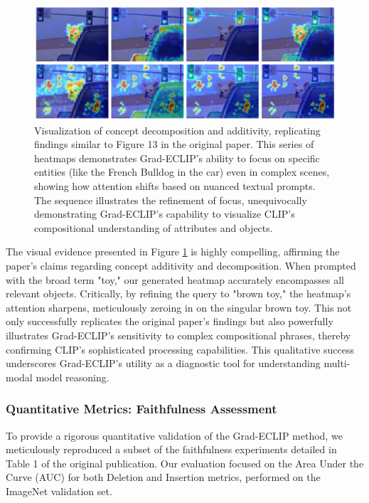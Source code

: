 \documentclass[10pt]{article} %
\begin{document}
\begin{figure}[h!]
\centering
\includegraphics[width=\linewidth]{./../assets/images/Grad-ECLIP-output.png} 
\caption{Visualization of concept decomposition and additivity, replicating findings similar to Figure 13 in the original paper. This series of heatmaps demonstrates Grad-ECLIP's ability to focus on specific entities (like the French Bulldog in the car) even in complex scenes, showing how attention shifts based on nuanced textual prompts. The sequence illustrates the refinement of focus, unequivocally demonstrating Grad-ECLIP's capability to visualize CLIP's compositional understanding of attributes and objects.}
\label{fig:decomposition_repro}
\end{figure}

The visual evidence presented in Figure \ref{fig:decomposition_repro} is highly compelling, affirming the paper's claims regarding concept additivity and decomposition. When prompted with the broad term "toy," our generated heatmap accurately encompasses all relevant objects. Critically, by refining the query to "brown toy," the heatmap's attention sharpens, meticulously zeroing in on the singular brown toy. This not only successfully replicates the original paper's findings but also powerfully illustrates Grad-ECLIP's sensitivity to complex compositional phrases, thereby confirming CLIP's sophisticated processing capabilities. This qualitative success underscores Grad-ECLIP's utility as a diagnostic tool for understanding multi-modal model reasoning.

\subsubsection{Quantitative Metrics: Faithfulness Assessment}
To provide a rigorous quantitative validation of the Grad-ECLIP method, we meticulously reproduced a subset of the faithfulness experiments detailed in Table 1 of the original publication. Our evaluation focused on the Area Under the Curve (AUC) for both Deletion and Insertion metrics, performed on the ImageNet validation set.
\end{document}
